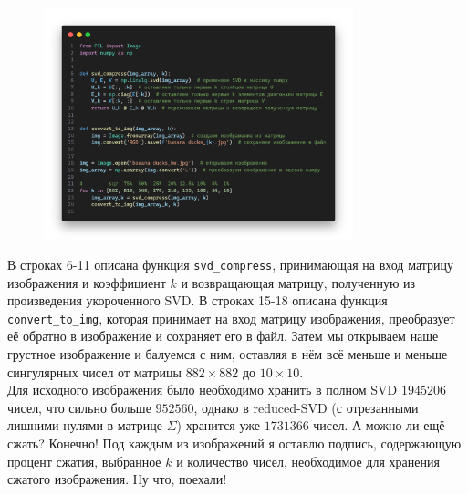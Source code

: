 \documentclass[a3paper,14pt]{extarticle}
\begin{document}
\begin{figure}[H]
    \centering\includegraphics[width=0.8\textwidth]{code3.png}
\end{figure} \noindent
В строках 6-11 описана функция \texttt{svd\_compress}, принимающая на вход матрицу изображения и коэффициент $k$ и возвращающая матрицу, полученную из произведения укороченного SVD. В строках 15-18 описана функция \texttt{convert\_to\_img}, которая принимает на вход матрицу изображения, преобразует её обратно в изображение и сохраняет его в файл. Затем мы открываем наше грустное изображение и балуемся с ним, оставляя в нём всё меньше и меньше сингулярных чисел от матрицы $882\times882$ до $10\times10$.\\[1em]
Для исходного изображения было необходимо хранить в полном SVD $1945206$ чисел, что сильно больше $952560$, однако в reduced-SVD (с отрезанными лишними нулями в матрице $\Sigma$) хранится уже $1731366$ чисел. А можно ли ещё сжать? Конечно! Под каждым из изображений я оставлю подпись, содержающую процент сжатия, выбранное $k$ и количество чисел, необходимое для хранения сжатого изображения. Ну что, поехали!
\end{document}

